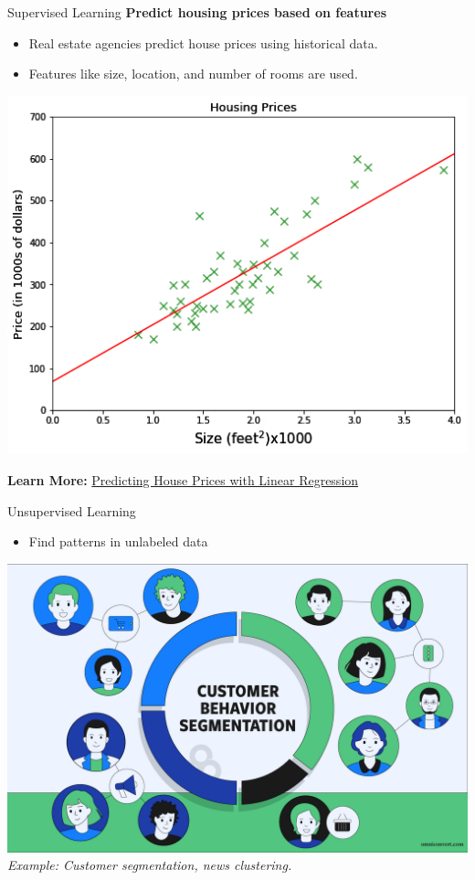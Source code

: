 \documentclass[serif, aspectratio=169]{beamer}
\begin{document}
\begin{frame}{Supervised Learning}
\textbf{Predict housing prices based on features}

\begin{itemize}
    \item Real estate agencies predict house prices using historical data.
    \item Features like size, location, and number of rooms are used.
\end{itemize}

\begin{center}
    \includegraphics[width=0.6\linewidth]{pic/be1.jpg}
\end{center}

\textbf{Learn More:}
\href{https://towardsdatascience.com/predicting-house-prices-with-linear-regression-machine-learning-from-scratch-part-ii-47a0238aeac1}{Predicting House Prices with Linear Regression}
\end{frame}

\begin{frame}{Unsupervised Learning}
    \begin{itemize}
        \item Find patterns in unlabeled data
    \end{itemize}
    \vspace{1cm}
    \includegraphics[width=\linewidth]{pic/be2.jpg} 
    \textit{Example: Customer segmentation, news clustering.}
\end{frame}
\end{document}
